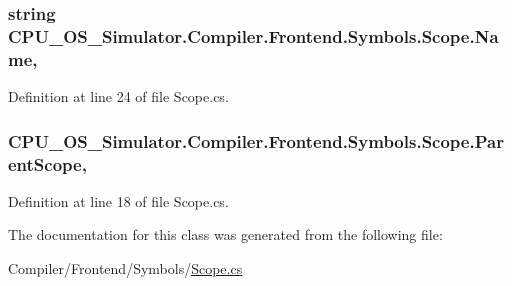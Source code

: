 \subsubsection[{Name}]{\setlength{\rightskip}{0pt plus 5cm}string C\+P\+U\+\_\+\+O\+S\+\_\+\+Simulator.\+Compiler.\+Frontend.\+Symbols.\+Scope.\+Name\hspace{0.3cm}{\ttfamily [get]}, {\ttfamily [set]}}\label{class_c_p_u___o_s___simulator_1_1_compiler_1_1_frontend_1_1_symbols_1_1_scope_a6f4db261e3efb4e1313c6c25c84f6b42}


Definition at line 24 of file Scope.\+cs.

\hypertarget{class_c_p_u___o_s___simulator_1_1_compiler_1_1_frontend_1_1_symbols_1_1_scope_abac9b9beb5da3ae1395d91d223889809}{}
\subsubsection[{Parent\+Scope}]{ C\+P\+U\+\_\+\+O\+S\+\_\+\+Simulator.\+Compiler.\+Frontend.\+Symbols.\+Scope.\+Parent\+Scope\hspace{0.3cm}{\ttfamily [get]}, {\ttfamily [set]}}\label{class_c_p_u___o_s___simulator_1_1_compiler_1_1_frontend_1_1_symbols_1_1_scope_abac9b9beb5da3ae1395d91d223889809}


Definition at line 18 of file Scope.\+cs.



The documentation for this class was generated from the following file\+:\begin{DoxyCompactItemize}
\item 
Compiler/\+Frontend/\+Symbols/\hyperlink{_scope_8cs}{Scope.\+cs}\end{DoxyCompactItemize}
